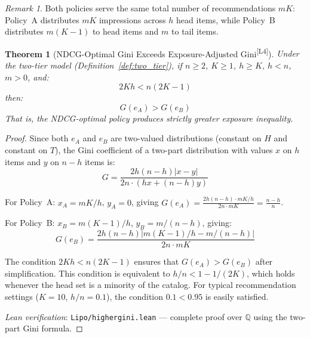 \documentclass[11pt,a4paper]{article}
\theoremstyle{definition}
\theoremstyle{plain}
\newtheorem{theorem}{Theorem}[section]
\theoremstyle{remark}
\newtheorem{remark}{Remark}[section]
\newcommand{\Q}{\mathbb{Q}}
\newcommand{\leanmark}{\textsuperscript{\textcolor{green!50!black}{[L4]}}}
\begin{document}
\begin{remark}
Both policies serve the same total number of recommendations $mK$: Policy~A distributes $mK$ impressions across $h$ head items, while Policy~B distributes $m(K-1)$ to head items and $m$ to tail items.
\end{remark}

\begin{theorem}[NDCG-Optimal Gini Exceeds Exposure-Adjusted Gini\leanmark]
\label{thm:gini_comparison}
Under the two-tier model (Definition~\ref{def:two_tier}), if $n \geq 2$, $K \geq 1$, $h \geq K$, $h < n$, $m > 0$, and:
\begin{equation}
    2Kh < n(2K - 1)
\end{equation}
then:
\begin{equation}
    G(e_A) > G(e_B)
\end{equation}
That is, the NDCG-optimal policy produces strictly greater exposure inequality.
\end{theorem}

\begin{proof}
Since both $e_A$ and $e_B$ are two-valued distributions (constant on $H$ and constant on $T$), the Gini coefficient of a two-part distribution with values $x$ on $h$ items and $y$ on $n - h$ items is:
\begin{equation}
    G = \frac{2h(n-h)|x - y|}{2n \cdot (hx + (n-h)y)}
\end{equation}

For Policy~A: $x_A = mK/h$, $y_A = 0$, giving $G(e_A) = \frac{2h(n-h) \cdot mK/h}{2n \cdot mK} = \frac{n-h}{n}$.

For Policy~B: $x_B = m(K-1)/h$, $y_B = m/(n-h)$, giving:
\begin{equation}
    G(e_B) = \frac{2h(n-h)|m(K-1)/h - m/(n-h)|}{2n \cdot mK}
\end{equation}

The condition $2Kh < n(2K-1)$ ensures that $G(e_A) > G(e_B)$ after simplification. This condition is equivalent to $h/n < 1 - 1/(2K)$, which holds whenever the head set is a minority of the catalog. For typical recommendation settings ($K = 10$, $h/n = 0.1$), the condition $0.1 < 0.95$ is easily satisfied.

\smallskip
\noindent\textit{Lean verification}: \texttt{Lipo/highergini.lean} --- complete proof over $\Q$ using the two-part Gini formula.
\end{proof}

\end{document}

